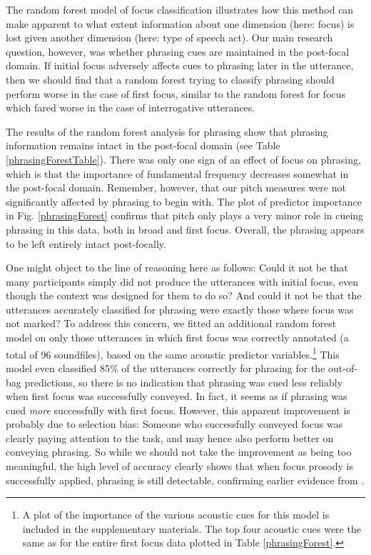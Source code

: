 \documentclass[preprint,review,12pt,authoryear,times]{elsarticle}
\begin{document}
The random forest model of focus classification illustrates how this method can make apparent to what extent information about one dimension (here: focus) is lost given another dimension (here: type of speech act). Our main research question, however, was whether phrasing cues are maintained in the post-focal domain. If initial focus adversely affects cues to phrasing later in the utterance, then we should find that a random forest trying to classify phrasing should perform worse in the case of first focus, similar to the random forest for focus which fared worse in the case of interrogative utterances. 

The results of the random forest analysis for phrasing show that phrasing information remains intact in the post-focal domain (see Table \ref{phrasingForestTable}). There was only one sign of an effect of focus on phrasing, which is that the importance of fundamental frequency decreases somewhat in the post-focal domain. Remember, however, that our pitch measures were not significantly affected by phrasing to begin with. The plot of predictor importance in Fig. \ref{phrasingForest} confirms that pitch only plays a very minor role in cueing phrasing in this data, both in broad and first focus. Overall, the phrasing appears to be left entirely intact post-focally.

One might object to the line of reasoning here as follows: Could it not be that many participants simply did not produce the utterances with initial focus, even though the context was designed for them to do so? And could it not be that the utterances accurately classified for phrasing were exactly those where focus was not marked? To address this concern, we fitted an additional random forest model on only those utterances in which first focus was correctly annotated (a total of 96 soundfiles), based on the same acoustic predictor variables.\footnote{A plot of the importance of the various acoustic cues for this model is included in the supplementary materials. The top four acoustic cues were the same as for the entire first focus data plotted in Table \ref{phrasingForest}.}  This model even classified 85\% of the utterances correctly for phrasing for the out-of-bag predictions, so there is no indication that phrasing was cued less reliably when first focus was successfully conveyed. In fact, it seems as if phrasing was cued {\em more} successfully with first focus. However, this apparent improvement is probably due to selection bias: Someone who successfully conveyed focus was clearly paying attention to the task, and may hence also perform better on conveying phrasing. So while we should not take the improvement as being too meaningful, the high level of accuracy clearly shows that when focus prosody is successfully applied, phrasing is still detectable, confirming earlier evidence from \citet{norcl05}.
\end{document}

